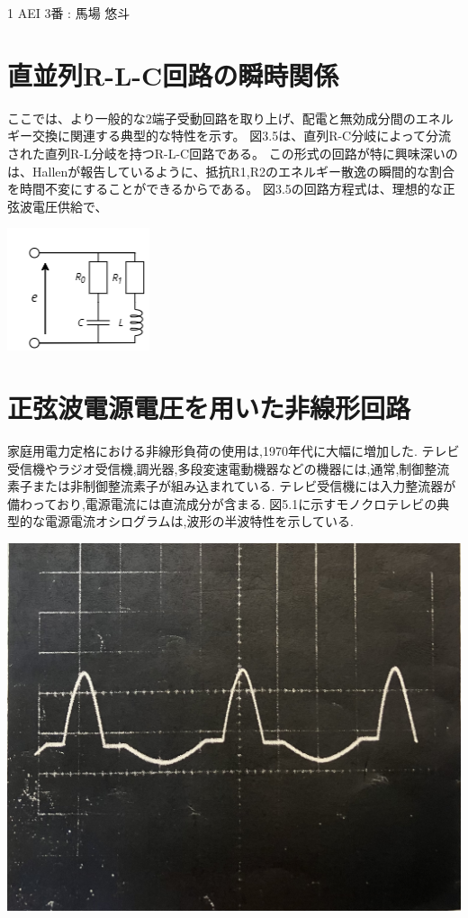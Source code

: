 \documentclass[fleqn,11pt,a4paper,dvipdfmx]{jsarticle}
\begin{document}
%
%
1 AEI 3番 : 馬場 悠斗
\setcounter{section}{2}
\section{直並列R-L-C回路の瞬時関係}


ここでは、より一般的な2端子受動回路を取り上げ、配電と無効成分間のエネルギー交換に関連する典型的な特性を示す。
図3.5は、直列R-C分岐によって分流された直列R-L分岐を持つR-L-C回路である。
この形式の回路が特に興味深いのは、Hallenが報告しているように、抵抗R1,R2のエネルギー散逸の瞬間的な割合を時間不変にすることができるからである。
図3.5の回路方程式は、理想的な正弦波電圧供給で、

\begin{center}
  \includegraphics[width=0.3\linewidth]{./Circuits/Circuits_Z3_5.png}
  \captionsetup{labelformat=empty} %
\end{center}

\setcounter{section}{4}
\section{正弦波電源電圧を用いた非線形回路}

家庭用電力定格における非線形負荷の使用は,1970年代に大幅に増加した.
テレビ受信機やラジオ受信機,調光器,多段変速電動機器などの機器には,通常,制御整流素子または非制御整流素子が組み込まれている.
テレビ受信機には入力整流器が備わっており,電源電流には直流成分が含まる.
図5.1に示すモノクロテレビの典型的な電源電流オシログラムは,波形の半波特性を示している.

\begin{center}
  \includegraphics[width=0.3\linewidth]{./Circuits/fig5_1.jpg}
  \captionsetup{labelformat=empty} %
\end{center}
\end{document}

